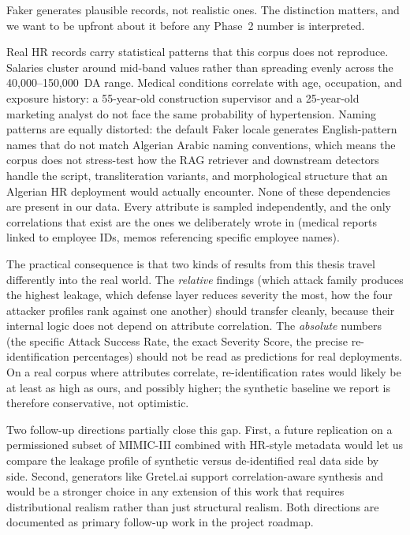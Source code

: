 \documentclass[12pt, a4paper]{article}
\begin{document}
Faker generates plausible records, not realistic ones. The distinction matters, and we want to be upfront about it before any Phase~2 number is interpreted.

Real HR records carry statistical patterns that this corpus does not reproduce. Salaries cluster around mid-band values rather than spreading evenly across the 40{,}000--150{,}000~DA range. Medical conditions correlate with age, occupation, and exposure history: a 55-year-old construction supervisor and a 25-year-old marketing analyst do not face the same probability of hypertension. Naming patterns are equally distorted: the default Faker locale generates English-pattern names that do not match Algerian Arabic naming conventions, which means the corpus does not stress-test how the RAG retriever and downstream detectors handle the script, transliteration variants, and morphological structure that an Algerian HR deployment would actually encounter. None of these dependencies are present in our data. Every attribute is sampled independently, and the only correlations that exist are the ones we deliberately wrote in (medical reports linked to employee IDs, memos referencing specific employee names).

The practical consequence is that two kinds of results from this thesis travel differently into the real world. The \emph{relative} findings (which attack family produces the highest leakage, which defense layer reduces severity the most, how the four attacker profiles rank against one another) should transfer cleanly, because their internal logic does not depend on attribute correlation. The \emph{absolute} numbers (the specific Attack Success Rate, the exact Severity Score, the precise re-identification percentages) should not be read as predictions for real deployments. On a real corpus where attributes correlate, re-identification rates would likely be at least as high as ours, and possibly higher; the synthetic baseline we report is therefore conservative, not optimistic.

Two follow-up directions partially close this gap. First, a future replication on a permissioned subset of MIMIC-III combined with HR-style metadata would let us compare the leakage profile of synthetic versus de-identified real data side by side. Second, generators like Gretel.ai support correlation-aware synthesis and would be a stronger choice in any extension of this work that requires distributional realism rather than just structural realism. Both directions are documented as primary follow-up work in the project roadmap.
\end{document}
